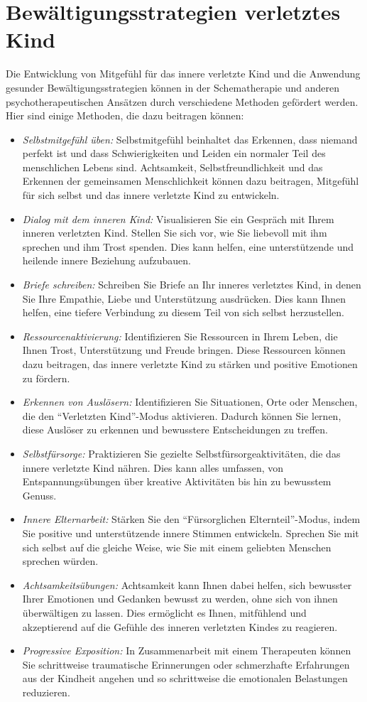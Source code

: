 \section{Bewältigungsstrategien verletztes Kind}
Die Entwicklung von Mitgefühl für das innere verletzte Kind und die Anwendung gesunder Bewältigungsstrategien können in der Schematherapie und anderen psychotherapeutischen Ansätzen durch verschiedene Methoden gefördert werden. Hier sind einige Methoden, die dazu beitragen können:
\begin{itemize}
    \item \emph{Selbstmitgefühl üben:} Selbstmitgefühl beinhaltet das Erkennen, dass niemand perfekt ist und dass Schwierigkeiten und Leiden ein normaler Teil des menschlichen Lebens sind. Achtsamkeit, Selbstfreundlichkeit und das Erkennen der gemeinsamen Menschlichkeit können dazu beitragen, Mitgefühl für sich selbst und das innere verletzte Kind zu entwickeln.
    \item \emph{Dialog mit dem inneren Kind:} Visualisieren Sie ein Gespräch mit Ihrem inneren verletzten Kind. Stellen Sie sich vor, wie Sie liebevoll mit ihm sprechen und ihm Trost spenden. Dies kann helfen, eine unterstützende und heilende innere Beziehung aufzubauen.
    \item \emph{Briefe schreiben:} Schreiben Sie Briefe an Ihr inneres verletztes Kind, in denen Sie Ihre Empathie, Liebe und Unterstützung ausdrücken. Dies kann Ihnen helfen, eine tiefere Verbindung zu diesem Teil von sich selbst herzustellen.
    \item \emph{Ressourcenaktivierung:} Identifizieren Sie Ressourcen in Ihrem Leben, die Ihnen Trost, Unterstützung und Freude bringen. Diese Ressourcen können dazu beitragen, das innere verletzte Kind zu stärken und positive Emotionen zu fördern.
    \item \emph{Erkennen von Auslösern:} Identifizieren Sie Situationen, Orte oder Menschen, die den \enquote{Verletzten Kind}-Modus aktivieren. Dadurch können Sie lernen, diese Auslöser zu erkennen und bewusstere Entscheidungen zu treffen.
    \item \emph{Selbstfürsorge:} Praktizieren Sie gezielte Selbstfürsorgeaktivitäten, die das innere verletzte Kind nähren. Dies kann alles umfassen, von Entspannungsübungen über kreative Aktivitäten bis hin zu bewusstem Genuss.
    \item \emph{Innere Elternarbeit:} Stärken Sie den \enquote{Fürsorglichen Elternteil}-Modus, indem Sie positive und unterstützende innere Stimmen entwickeln. Sprechen Sie mit sich selbst auf die gleiche Weise, wie Sie mit einem geliebten Menschen sprechen würden.
    \item \emph{Achtsamkeitsübungen:} Achtsamkeit kann Ihnen dabei helfen, sich bewusster Ihrer Emotionen und Gedanken bewusst zu werden, ohne sich von ihnen überwältigen zu lassen. Dies ermöglicht es Ihnen, mitfühlend und akzeptierend auf die Gefühle des inneren verletzten Kindes zu reagieren.
    \item \emph{Progressive Exposition:} In Zusammenarbeit mit einem Therapeuten können Sie schrittweise traumatische Erinnerungen oder schmerzhafte Erfahrungen aus der Kindheit angehen und so schrittweise die emotionalen Belastungen reduzieren.
\end{itemize}
